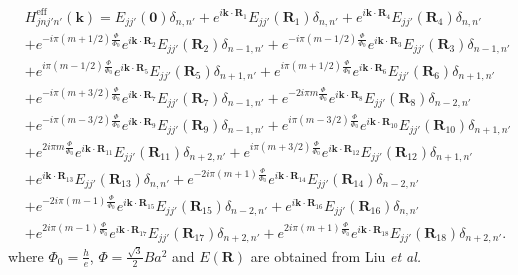 \documentclass{article}
\begin{document}
\begin{equation}
	\begin{aligned}
		&H_{jnj'n'}^{\text{eff}}(\mathbf{k})
		= E_{jj'}(\mathbf{0}) \delta_{n,n'} 
		+ e^{i\mathbf{k} \cdot \mathbf{R}_{1}}E_{jj'}(\mathbf{R}_{1}) \delta_{n,n'} 
		+ e^{i\mathbf{k} \cdot \mathbf{R}_{4}}E_{jj'}(\mathbf{R}_{4}) \delta_{n,n'}  \\
		& + e^{-i\pi(m + 1/2)\frac{\Phi}{\Phi_{0}}}e^{i\mathbf{k} \cdot \mathbf{R}_{2}} E_{jj'}(\mathbf{R}_{2}) \delta_{n-1,n'} 
		+ e^{-i\pi(m - 1/2)\frac{\Phi}{\Phi_{0}}} e^{i\mathbf{k} \cdot \mathbf{R}_{3}} E_{jj'}(\mathbf{R}_{3}) \delta_{n-1,n'} \\
		& + e^{i\pi(m - 1/2)\frac{\Phi}{\Phi_{0}}} e^{i\mathbf{k} \cdot \mathbf{R}_{5}} E_{jj'}(\mathbf{R}_{5}) \delta_{n+1,n'} 
		+ e^{i\pi(m + 1/2)\frac{\Phi}{\Phi_{0}}} e^{i\mathbf{k} \cdot \mathbf{R}_{6}} E_{jj'}(\mathbf{R}_{6}) \delta_{n+1,n'} \\
		& + e^{- i\pi(m + 3/2)\frac{\Phi}{\Phi_{0}} } e^{i \mathbf{k} \cdot \mathbf{R}_{7}} E_{jj'}(\mathbf{R}_{7}) \delta_{n-1,n'} 
		+ e^{- 2i\pi m\frac{\Phi}{\Phi_{0}} } e^{i \mathbf{k} \cdot \mathbf{R}_{8}} E_{jj'}(\mathbf{R}_{8}) \delta_{n-2,n'} \\
		& + e^{- i\pi(m - 3/2)\frac{\Phi}{\Phi_{0}} } e^{i \mathbf{k} \cdot \mathbf{R}_{9}} E_{jj'}(\mathbf{R}_{9}) \delta_{n-1,n'} 
		+ e^{ i\pi (m-3/2)\frac{\Phi}{\Phi_{0}} } e^{i \mathbf{k} \cdot \mathbf{R}_{10}} E_{jj'}(\mathbf{R}_{10}) \delta_{n+1,n'} \\
		& + e^{2 i\pi m \frac{\Phi}{\Phi_{0}} } e^{i \mathbf{k} \cdot \mathbf{R}_{11}} E_{jj'}(\mathbf{R}_{11}) \delta_{n+2,n'} 
		+ e^{ i\pi (m+3/2)\frac{\Phi}{\Phi_{0}} } e^{i \mathbf{k} \cdot \mathbf{R}_{12}} E_{jj'}(\mathbf{R}_{12}) \delta_{n+1,n'} \\
		& + e^{i \mathbf{k} \cdot \mathbf{R}_{13}} E_{jj'}(\mathbf{R}_{13}) \delta_{n,n'} 
		+ e^{-2i\pi(m + 1) \frac{\Phi}{\Phi_{0}} } e^{i \mathbf{k} \cdot \mathbf{R}_{14}} E_{jj'}(\mathbf{R}_{14}) \delta_{n-2,n'}  \\
		& + e^{-2i\pi(m - 1) \frac{\Phi}{\Phi_{0}}} e^{i \mathbf{k} \cdot \mathbf{R}_{15}} E_{jj'}(\mathbf{R}_{15}) \delta_{n-2,n'} 
		+ e^{i \mathbf{k} \cdot \mathbf{R}_{16}} E_{jj'}(\mathbf{R}_{16}) \delta_{n,n'}                                 \\
		& + e^{2i\pi(m - 1)\frac{\Phi}{\Phi_{0}}} e^{i \mathbf{k} \cdot \mathbf{R}_{17}} E_{jj'}(\mathbf{R}_{17}) \delta_{n+2,n'} 
		+ e^{2i\pi(m + 1)\frac{\Phi}{\Phi_{0}}} e^{i \mathbf{k} \cdot \mathbf{R}_{18}} E_{jj'}(\mathbf{R}_{18}) \delta_{n+2,n'}.
	\end{aligned}
\end{equation}
where $\Phi_{0} = \frac{h}{e}$, $\Phi = \frac{\sqrt{3}}{2} Ba^{2}$ and $E(\mathbf{R})$ are obtained from Liu \textit{et al.}
\end{document}
